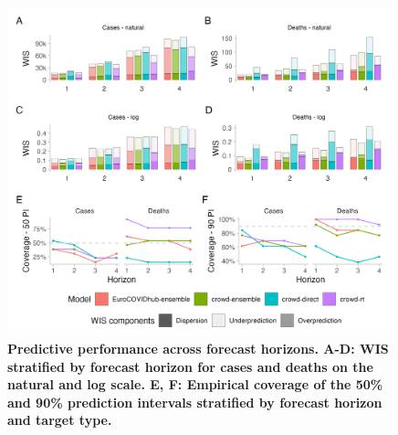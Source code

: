 \documentclass[10pt,a4paper,twocolumn]{article}
\begin{document}


\begin{figure}[ht]
\includegraphics[width=0.99\textwidth]{../output/figures/performance.png}
\caption{\bf{Predictive performance across forecast horizons.} A-D: WIS stratified by forecast horizon for cases and deaths on the natural and log scale. E, F: Empirical coverage of the 50\% and 90\% prediction intervals stratified by forecast horizon and target type.}
\label{fig:performance}
\end{figure}
\end{document}
